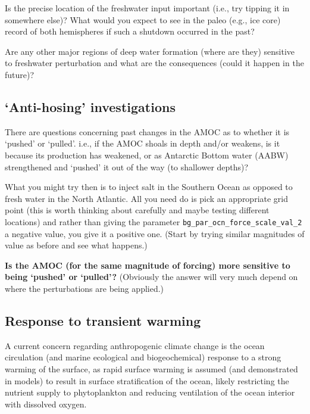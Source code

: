 \documentclass[11pt,fleqn]{book} %
\begin{document}
Is the precise location of the freshwater input important (i.e., try tipping it in somewhere else)? What would you expect to see in the paleo (e.g., ice core) record of both hemispheres if such a shutdown occurred in the past?

Are any other major regions of deep water formation (where are they) sensitive to freshwater perturbation and what are the consequences (could it happen in the future)?


\subsection{‘Anti-hosing’ investigations}

There are questions concerning past changes in the AMOC as to whether it is ‘pushed’ or ‘pulled’. i.e., if the AMOC shoals in depth and/or weakens, is it because its production has weakened, or as Antarctic Bottom water (AABW) strengthened and ‘pushed’ it out of the way (to shallower depths)?

What you might try then is to inject salt in the Southern Ocean as opposed to fresh water in the North Atlantic. All you need do is pick an appropriate grid point (this is worth thinking about carefully and maybe testing different locations) and rather than giving the parameter \texttt{bg\_par\_ocn\_force\_scale\_val\_2} a negative value, you give it a positive one. (Start by trying similar magnitudes of value as before and see what happens.) 

\textbf{Is the AMOC (for the same magnitude of forcing) more sensitive to being ‘pushed’ or ‘pulled’?} (Obviously the answer will very much depend on where the perturbations are being applied.)


\subsection{Response to transient warming}

A current concern regarding anthropogenic climate change is the ocean circulation (and marine ecological and biogeochemical) response to a strong warming of the surface, as rapid surface warming is assumed (and demonstrated in models) to result in surface stratification of the ocean, likely restricting the nutrient supply to phytoplankton and reducing ventilation of the ocean interior with dissolved oxygen.
\end{document}

